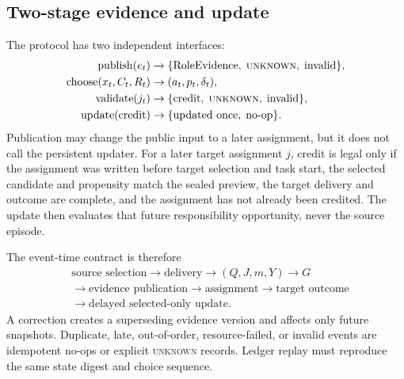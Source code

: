 \documentclass[sigconf,anonymous]{aamas}
\newcommand{\unknown}{\textsc{unknown}}
\begin{document}
\subsection{Two-stage evidence and update}
The protocol has two independent interfaces:
\begin{align}
 \operatorname{publish}(e_t)&\rightarrow \{\text{RoleEvidence},\;\unknown{},\;\text{invalid}\},\\
 \operatorname{choose}(x_t,C_t,R_t)&\rightarrow (a_t,p_t,\delta_t),\\
 \operatorname{validate}(j_t)&\rightarrow \{\text{credit},\;\unknown{},\;\text{invalid}\},\\
 \operatorname{update}(\text{credit})&\rightarrow \{\text{updated once},\;\text{no-op}\}.
 \label{eq:interfaces}
\end{align}
Publication may change the public input to a later assignment, but it does not call the persistent updater. For a later target assignment $j$, credit is legal only if the assignment was written before target selection and task start, the selected candidate and propensity match the sealed preview, the target delivery and outcome are complete, and the assignment has not already been credited. The update then evaluates that future responsibility opportunity, never the source episode.

The event-time contract is therefore
\begin{equation}
\begin{aligned}
&\text{source selection}\rightarrow\text{delivery}\rightarrow(Q,J,m,Y)\rightarrow G\\
&\rightarrow\text{evidence publication}\rightarrow\text{assignment}\rightarrow\text{target outcome}\\
&\rightarrow\text{delayed selected-only update}.
\end{aligned}
\label{eq:timeline}
\end{equation}
A correction creates a superseding evidence version and affects only future snapshots. Duplicate, late, out-of-order, resource-failed, or invalid events are idempotent no-ops or explicit \unknown{} records. Ledger replay must reproduce the same state digest and choice sequence.
\end{document}
